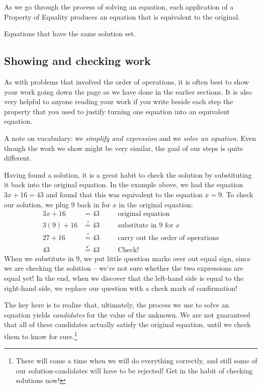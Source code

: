 As we go through the process of solving an equation, each application of a Property of Equality produces an equation that is equivalent to the original.

\begin{boxeddef}
Equations that have the same solution set.
\end{boxeddef}

\subsection{Showing and checking work}

As with problems that involved the order of operations, it is often best to show your work going down the page as we have done in the earlier sections. It is also very helpful to anyone reading your work if you write beside each step the property that you used to justify turning one equation into an equivalent equation.

A note on vocabulary: we \textit{simplify and expression} and we \textit{solve an equation}. Even though the work we show might be very similar, the goal of our steps is quite different.

Having found a solution, it is a great habit to check the solution by substituting it back into the original equation. In the example above, we had the equation $3x+16=43$ and found that this was equivalent to the equation $x=9$. To check our solution, we plug 9 back in for $x$ in the original equation:
\[\begin{aligned}
3x + 16 & = 43
&&\quad\text{original equation}\\
3(9) + 16 & \overset{?}{=} 43
&&\quad\text{substitute in 9 for $x$}\\
27 + 16 & \overset{?}{=} 43
&&\quad\text{carry out the order of operations}\\
43 & \overset{\checkmark}{=} 43
&&\quad\text{Check!}
\end{aligned}\]
When we substitute in 9, we put little question marks over out equal sign, since we are checking the solution -- we're not sure whether the two expressions are equal yet! In the end, when we discover that the left-hand side is equal to the right-hand side, we replace our question with a check mark of confirmation!

The key here is to realize that, ultimately, the process we use to solve an equation yields \textit{candidates} for the value of the unknown. We are not guaranteed that all of these candidates actually satisfy the original equation, until we check them to know for sure.\footnote{There will come a time when we will do everything correctly, and still some of our solution-candidates will have to be rejected! Get in the habit of checking solutions now!}

